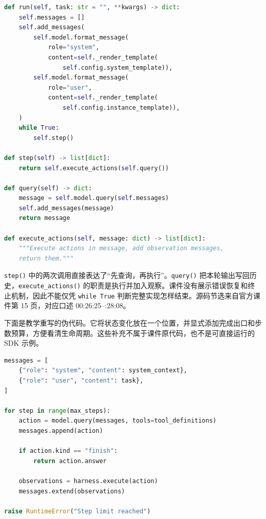 \documentclass[11pt,a4paper]{article}
\begin{document}
\noindent\begin{minipage}{\textwidth}
\begin{lstlisting}[caption={mini-swe-agent：课堂展示的控制器源码节选},language=Python]
def run(self, task: str = "", **kwargs) -> dict:
    self.messages = []
    self.add_messages(
        self.model.format_message(
            role="system",
            content=self._render_template(
                self.config.system_template)),
        self.model.format_message(
            role="user",
            content=self._render_template(
                self.config.instance_template)),
    )
    while True:
        self.step()

def step(self) -> list[dict]:
    return self.execute_actions(self.query())

def query(self) -> dict:
    message = self.model.query(self.messages)
    self.add_messages(message)
    return message

def execute_actions(self, message: dict) -> list[dict]:
    """Execute actions in message, add observation messages,
    return them."""
\end{lstlisting}
\end{minipage}

\texttt{step()} 中的两次调用直接表达了“先查询，再执行”。\texttt{query()} 把本轮输出写回历史，\texttt{execute\_\allowbreak actions()} 的职责是执行并加入观察。课件没有展示错误恢复和终止机制，因此不能仅凭 \texttt{while True} 判断完整实现怎样结束。源码节选来自官方课件第 15 页，对应口述 00:26:25--:28:08。

下面是教学重写的伪代码。它将状态变化放在一个位置，并显式添加完成出口和步数预算，方便看清生命周期。这些补充不属于课件原代码，也不是可直接运行的 SDK 示例。

\noindent\begin{minipage}{\textwidth}
\begin{lstlisting}[caption={教学伪代码：查询、执行、观察回流与结束},language=Python]
messages = [
    {"role": "system", "content": system_context},
    {"role": "user", "content": task},
]

for step in range(max_steps):
    action = model.query(messages, tools=tool_definitions)
    messages.append(action)

    if action.kind == "finish":
        return action.answer

    observations = harness.execute(action)
    messages.extend(observations)

raise RuntimeError("Step limit reached")
\end{lstlisting}
\end{minipage}
\end{document}
